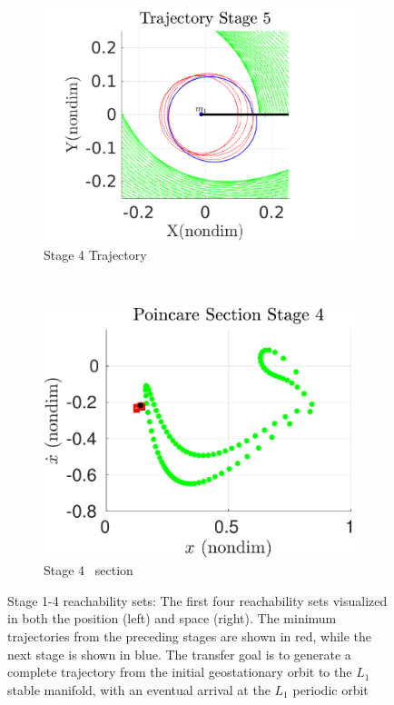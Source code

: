 \begin{figure}[htbp]
    \begin{subfigure}[htbp]{0.5\textwidth} 
        \includegraphics[width=\textwidth, keepaspectratio]{figures/2017_JAS/stage5_trajectory_zoom.pdf} 
        \caption{Stage 4 Trajectory~\label{fig:stage4_trajecotry_zoom}} 
    \end{subfigure}~
    \begin{subfigure}[htbp]{0.5\textwidth} 
        \includegraphics[width=\textwidth, keepaspectratio]{figures/2017_JAS/stage4_poincare.pdf} 
        \caption{Stage 4 \Poincare~section \label{fig:stage4_poincare}} 
    \end{subfigure}   
    \caption{Stage 1-4 reachability sets: The first four reachability sets visualized in both the position (left) and \Poincare space (right).
        The minimum trajectories from the preceding stages are shown in red, while the next stage is shown in blue.
    The transfer goal is to generate a complete trajectory from the initial geostationary orbit to the \( L_1 \) stable manifold, with an eventual arrival at the \( L_1 \) periodic orbit~\label{fig:stage1to4_reachability}}
\end{figure}
